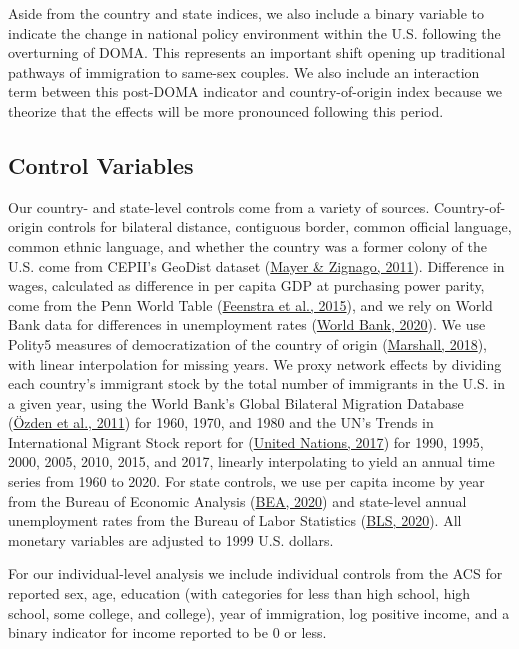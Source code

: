 \documentclass[
  11pt,
]{article}
\begin{document}
Aside from the country and state indices, we also include a binary variable to indicate the change in national policy environment within the U.S. following the overturning of DOMA. This represents an important shift opening up traditional pathways of immigration to same-sex couples. We also include an interaction term between this post-DOMA indicator and country-of-origin index because we theorize that the effects will be more pronounced following this period.

\hypertarget{control-variables}{%
\subsection{Control Variables}\label{control-variables}}

Our country- and state-level controls come from a variety of sources. Country-of-origin controls for bilateral distance, contiguous border, common official language, common ethnic language, and whether the country was a former colony of the U.S. come from CEPII's GeoDist dataset (\protect\hyperlink{ref-mayer_2011}{Mayer \& Zignago, 2011}). Difference in wages, calculated as difference in per capita GDP at purchasing power parity, come from the Penn World Table (\protect\hyperlink{ref-feenstra_2015}{Feenstra et al., 2015}), and we rely on World Bank data for differences in unemployment rates (\protect\hyperlink{ref-worldbank_2020}{World Bank, 2020}). We use Polity5 measures of democratization of the country of origin (\protect\hyperlink{ref-marshall_2018}{Marshall, 2018}), with linear interpolation for missing years. We proxy network effects by dividing each country's immigrant stock by the total number of immigrants in the U.S. in a given year, using the World Bank's Global Bilateral Migration Database (\protect\hyperlink{ref-ozden_2011}{Özden et al., 2011}) for 1960, 1970, and 1980 and the UN's Trends in International Migrant Stock report for (\protect\hyperlink{ref-unitednations_2017}{United Nations, 2017}) for 1990, 1995, 2000, 2005, 2010, 2015, and 2017, linearly interpolating to yield an annual time series from 1960 to 2020. For state controls, we use per capita income by year from the Bureau of Economic Analysis (\protect\hyperlink{ref-bea_2020}{BEA, 2020}) and state-level annual unemployment rates from the Bureau of Labor Statistics (\protect\hyperlink{ref-bls_2020}{BLS, 2020}). All monetary variables are adjusted to 1999 U.S. dollars.

For our individual-level analysis we include individual controls from the ACS for reported sex, age, education (with categories for less than high school, high school, some college, and college), year of immigration, log positive income, and a binary indicator for income reported to be 0 or less.
\end{document}
